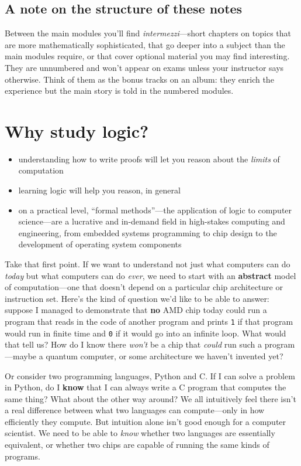 \documentclass[11pt]{article}
\begin{document}
\subsection*{A note on the structure of these notes}
Between the main modules you'll find \emph{intermezzi}---short chapters on topics that are more mathematically sophisticated, that go deeper into a subject than the main modules require, or that cover optional material you may find interesting. They are unnumbered and won't appear on exams unless your instructor says otherwise. Think of them as the bonus tracks on an album: they enrich the experience but the main story is told in the numbered modules.

\section{Why study logic?}
\begin{itemize}
  \item understanding how to write proofs will let you reason about the \emph{limits} of computation
  \item learning logic will help you reason, in general
  \item on a practical level, ``formal methods''---the application of logic to computer science---are a lucrative and in-demand field in high-stakes computing and engineering, from embedded systems programming to chip design to the development of operating system components
\end{itemize}

Take that first point. If we want to understand not just what computers can do \emph{today} but what computers can do \emph{ever}, we need to start with an \textbf{abstract} model of computation---one that doesn't depend on a particular chip architecture or instruction set. Here's the kind of question we'd like to be able to answer: suppose I managed to demonstrate that \textbf{no} AMD chip today could run a program that reads in the code of another program and prints \texttt{1} if that program would run in finite time and \texttt{0} if it would go into an infinite loop. What would that tell us? How do I know there \emph{won't} be a chip that \emph{could} run such a program---maybe a quantum computer, or some architecture we haven't invented yet?

Or consider two programming languages, Python and C. If I can solve a problem in Python, do I \textbf{know} that I can always write a C program that computes the same thing? What about the other way around? We all intuitively feel there isn't a real difference between what two languages can compute---only in how efficiently they compute. But intuition alone isn't good enough for a computer scientist. We need to be able to \emph{know} whether two languages are essentially equivalent, or whether two chips are capable of running the same kinds of programs.
\end{document}
